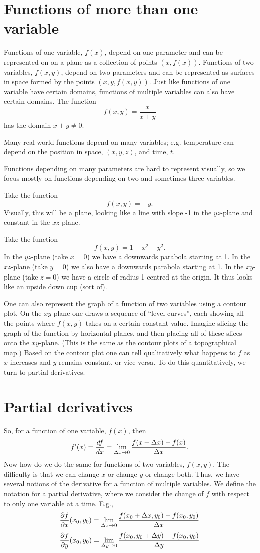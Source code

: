 \section{Functions of more than one variable}

Functions of one variable, $f(x)$, depend on one parameter and can be represented on on a plane as a collection of points $(x,f(x))$. Functions of two variables, $f(x,y)$, depend on two parameters and can be represented as surfaces in space formed by the points $(x,y,f(x,y))$. Just like functions of one variable have certain domains, functions of multiple variables can also have certain domains. 
\bex
The function
\[ f(x,y) = \frac{x}{x+y} \]
has the domain $x+y \ne 0$. 
\eex

Many real-world functions depend on many variables; e.g. temperature can depend on the position in space, $(x,y,z)$, and time, $t$. 

Functions depending on many parameters are hard to represent visually, so we focus mostly on functions depending on two and sometimes three variables. 

\bex
Take the function
\[ f(x,y)=-y. \]
Visually, this will be a plane, looking like a line with slope -1 in the $yz$-plane and constant in the $xz$-plane. 
\eex

\bex
Take the function 
\[ f(x,y) = 1 - x^2 - y^2. \]
In the $yz$-plane (take $x=0$) we have a downwards parabola starting at 1. In the $xz$-plane (take $y=0$) we also have a downwards parabola starting at 1. In the $xy$-plane (take $z=0$) we have a circle of radius 1 centred at the origin. It thus looks like an upside down cup (sort of).
\eex

One can also represent the graph of a function of two variables using a contour plot. On the $xy$-plane one draws a sequence of ``level curves'', each showing all the points where $f(x,y)$ takes on a certain constant value. Imagine slicing the graph of the function by horizontal planes, and then placing all of these slices onto the $xy$-plane. (This is the same as the contour plots of a topographical map.) Based on the contour plot one can tell qualitatively what happens to $f$ as $x$ increases and $y$ remains constant, or vice-versa. To do this quantitatively, we turn to partial derivatives. 

\section{Partial derivatives}

So, for a function of one variable, $f(x)$, then
\[ f'(x) = \frac{df}{dx} = \lim_{\Delta x \to 0} \frac{f(x+\Delta x)-f(x)}{\Delta x}. \]
Now how do we do the same for functions of two variables, $f(x,y)$. The difficulty is that we can change $x$ or change $y$ or change both. Thus, we have several notions of the derivative for a function of multiple variables. We define the notation for a partial derivative, where we consider the change of $f$ with respect to only one variable at a time. E.g., 
\[ \frac{\partial f}{\partial x}(x_0,y_0)= \lim_{\Delta x \to 0} \frac{f(x_0 + \Delta x,y_0)-f(x_0,y_0)}{\Delta x} \]
\[ \frac{\partial f}{\partial y}(x_0,y_0)= \lim_{\Delta y \to 0} \frac{f(x_0,y_0+\Delta y)-f(x_0,y_0)}{\Delta y} \]

